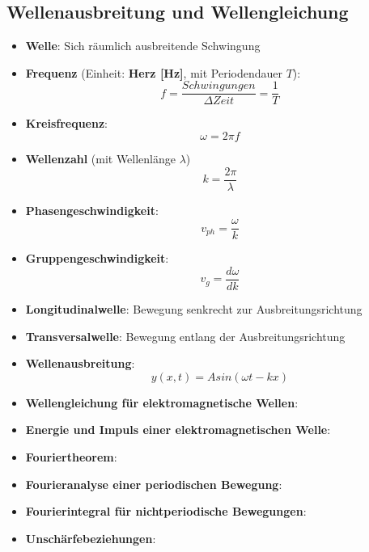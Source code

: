 \subsection{Wellenausbreitung und Wellengleichung}%
\label{schwellen:sub:wellenausbreitung_und_wellengleichung}

\begin{itemize}
	\item \textbf{Welle}: Sich räumlich ausbreitende Schwingung
	\item \textbf{Frequenz} (Einheit: \textbf{Herz [Hz]}, mit Periodendauer $T$):
	\begin{equation}
		f = \frac{Schwingungen}{\Delta Zeit} = \frac{1}{T}
	\end{equation}
	\item \textbf{Kreisfrequenz}:
	\begin{equation}
		\omega = 2\pi f
	\end{equation}
	\item \textbf{Wellenzahl} (mit Wellenlänge $\lambda$)
	\begin{equation}
		k = \frac{2\pi}{\lambda}
	\end{equation}
	\item \textbf{Phasengeschwindigkeit}:
	\begin{equation}
		v_{ph} = \frac{\omega}{k}
	\end{equation}
	\item \textbf{Gruppengeschwindigkeit}:
	\begin{equation}
		v_g = \frac{d\omega}{dk}
	\end{equation}
	\item \textbf{Longitudinalwelle}: Bewegung senkrecht zur Ausbreitungsrichtung
	\item \textbf{Transversalwelle}: Bewegung entlang der Ausbreitungsrichtung
	\item \textbf{Wellenausbreitung}:
	\begin{equation}
		y(x, t) = Asin(\omega t - kx)
	\end{equation}
	\item \textbf{Wellengleichung für elektromagnetische Wellen}:
	\item \textbf{Energie und Impuls einer elektromagnetischen Welle}:
	\item \textbf{Fouriertheorem}:
	\item \textbf{Fourieranalyse einer periodischen Bewegung}:
	\item \textbf{Fourierintegral für nichtperiodische Bewegungen}:
	\item \textbf{Unschärfebeziehungen}:
\end{itemize}

